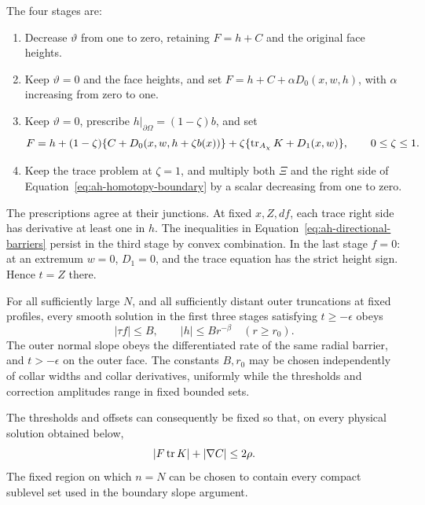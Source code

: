 The four stages are:
\begin{enumerate}[label=(\roman*)]
 \item Decrease \(\vartheta\) from one to zero, retaining \(F=h+C\)
       and the original face heights.
 \item Keep \(\vartheta=0\) and the face heights, and set
       \(F=h+C+\alpha D_0(x,w,h)\), with \(\alpha\) increasing from
       zero to one.
 \item Keep \(\vartheta=0\), prescribe \(h|_{\partial\Omega}=(1-\zeta)b\),
       and set
       \begin{equation}\label{eq:ah-third-stage}
       F=h+(1-\zeta)\{C+D_0(x,w,h+\zeta b(x))\}
          +\zeta\{\operatorname{tr}_{A_\chi}K+D_1(x,w)\},
       \qquad 0\le\zeta\le1.
       \end{equation}
 \item Keep the trace problem at \(\zeta=1\), and multiply both
       \(\Xi\) and the right side of
       Equation~\eqref{eq:ah-homotopy-boundary} by a scalar decreasing
       from one to zero.
\end{enumerate}
The prescriptions agree at their junctions.  At fixed \(x,Z,df\),
each trace right side has derivative at least one in \(h\).
The inequalities in Equation~\eqref{eq:ah-directional-barriers}
persist in the third stage by convex combination.  In the last
stage \(f=0\): at an extremum \(w=0\), \(D_1=0\), and the trace
equation has the strict height sign.  Hence \(t=Z\) there.

\begin{lemma}
\label{lem:ah-heights}
For all sufficiently large \(N\), and all sufficiently distant outer
truncations at fixed profiles, every smooth solution in the first
three stages satisfying \(t\ge-\epsilon\) obeys
\begin{equation}\label{eq:ah-height-bounds}
 |\tau f|\le B,\qquad |h|\le Br^{-\beta}\quad(r\ge r_0).
\end{equation}
The outer normal slope obeys the differentiated rate of the same
radial barrier, and \(t>-\epsilon\) on the outer face.  The constants
\(B,r_0\) may be chosen independently of collar widths and collar
derivatives, uniformly while the thresholds and correction amplitudes
range in fixed bounded sets.

The thresholds and offsets can consequently be fixed so that, on
every physical solution obtained below,
\begin{equation}\label{eq:ah-offset-budget}
 |F\operatorname{tr} K|+|\nabla C|\le2\rho .
\end{equation}
The fixed region on which \(n=N\) can be chosen to contain every
compact sublevel set used in the boundary slope argument.
\end{lemma}

